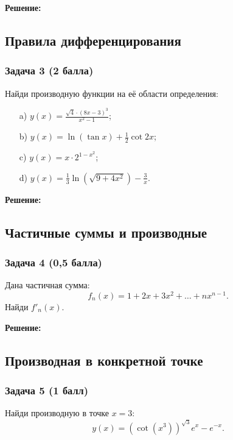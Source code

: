 \documentclass[a4paper,12pt]{article}
\begin{document}
\textbf{Решение:}


\vspace{1cm}

\subsection{Правила дифференцирования}

\subsubsection{Задача 3 (2 балла)}
Найди производную функции на её области определения:
\begin{enumerate}
    \item[a)] \( y(x) = \frac{\sqrt{4} \cdot (8x - 3)^3}{x^2 - 1} \);
    \item[b)] \( y(x) = \ln(\tan x) + \frac{1}{2} \cot 2x \);
    \item[c)] \( y(x) = x \cdot 2^{1 - x^2} \);
    \item[d)] \( y(x) = \frac{1}{3} \ln\left(\sqrt{9 + 4x^2}\right) - \frac{3}{x} \).
\end{enumerate}

\textbf{Решение:}


\vspace{1cm}

\subsection{Частичные суммы и производные}

\subsubsection{Задача 4 (0,5 балла)}
Дана частичная сумма:
\[
f_n(x) = 1 + 2x + 3x^2 + \ldots + nx^{n-1}.
\]
Найди \( f'_n(x) \).

\textbf{Решение:}


\vspace{1cm}

\subsection{Производная в конкретной точке}

\subsubsection{Задача 5 (1 балл)}
Найди производную в точке \( x = 3 \):
\[
y(x) = \left(\cot\left(x^3\right)\right)^{\sqrt{3}} e^{x} - e^{-x}.
\]
\end{document}
